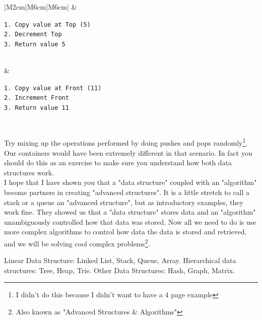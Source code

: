 \begin{longtable}{|M{2cm}|M{6cm}|M{6cm}|}
    & 
    \begin{minipage}[l]{6cm}
    \texttt{1. Copy value at Top (5)} \\
    \texttt{2. Decrement Top}\\
    \texttt{3. Return value 5}\\
    \end{minipage}\\
    & 
    \begin{minipage}[l]{6cm}
    \vspace{5mm}
    \texttt{1. Copy value at Front (11)} \\
    \texttt{2. Increment Front}\\
    \texttt{3. Return value 11}\\
    \end{minipage}\\
    \hline 
    \caption{Stack Queue Example Removals}
    \label{table:visible_stack_queue_remove}
\end{longtable}

Try mixing up the operations performed by doing pushes and pops randomly\footnote{I didn't do this because I didn't want to have a 4 page example}. Our containers would have been extremely different in that scenario. In fact you should do this as an exercise to make sure you understand how both data structures work.\\

I hope that I have shown you that a "data structure" coupled with an "algorithm" become partners in creating "advanced structures". It is a little stretch to call a stack or a queue an "advanced structure", but as introductory examples, they work fine. They showed us that a "data structure" stores data and an "algorithm" unambiguously controlled how that data was stored. Now all we need to do is use more complex algorithms to control how data the data is stored and retrieved, and we will be solving cool complex problems\footnote{Also known as "Advanced Structures \& Algorithms"}.\\


Linear Data Structure: Linked List, Stack, Queue, Array.
Hierarchical data structures: Tree, Heap, Trie.
Other Data Structures: Hash, Graph, Matrix.

